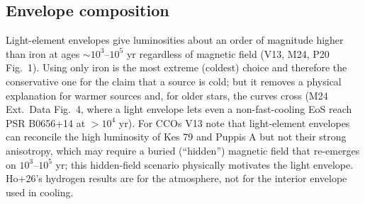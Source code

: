 \documentclass[11pt,a4paper]{article}
\begin{document}
\subsection{Envelope composition}
Light-element envelopes give luminosities about an order of magnitude higher than iron at ages $\sim10^3$--$10^5$ yr regardless of magnetic field (V13, M24, P20 Fig.~1). Using only iron is the most extreme (coldest) choice and therefore the conservative one for the claim that a source is cold; but it removes a physical explanation for warmer sources and, for older stars, the curves cross (M24 Ext.\ Data Fig.~4, where a light envelope lets even a non-fast-cooling EoS reach PSR B0656+14 at $>10^4$ yr). For CCOs V13 note that light-element envelopes can reconcile the high luminosity of Kes 79 and Puppis A but not their strong anisotropy, which may require a buried (``hidden'') magnetic field that re-emerges on $10^3$--$10^5$ yr; this hidden-field scenario physically motivates the light envelope. Ho+26's hydrogen results are for the atmosphere, not for the interior envelope used in cooling.
\end{document}
